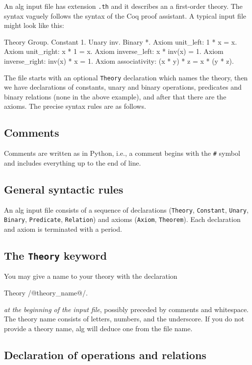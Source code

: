 \documentclass{article}
\begin{document}
An alg input file has extension \texttt{.th} and it describes an a
first-order theory. The syntax vaguely follows the syntax of the Coq
proof assistant. A typical input file might look like this:
%
\begin{source}
Theory Group.
Constant 1.
Unary inv.
Binary *.
Axiom unit_left: 1 * x = x.
Axiom unit_right: x * 1 = x.
Axiom inverse_left: x * inv(x) = 1.
Axiom inverse_right: inv(x) * x = 1.
Axiom associativity: (x * y) * z = x * (y * z).
\end{source}
%
The file starts with an optional \texttt{Theory} declaration which
names the theory, then we have declarations of constants, unary and
binary operations, predicates and binary relations (none in the above
example), and after that there are the axioms. The precise syntax
rules are as follows.

\subsection{Comments}

Comments are written as in Python, i.e., a comment begins with the
\texttt{\#} symbol and includes everything up to the end of line.

\subsection{General syntactic rules}

An alg input file consists of a sequence of declarations
(\texttt{Theory}, \texttt{Constant}, \texttt{Unary}, \texttt{Binary},
\texttt{Predicate}, \texttt{Relation}) and axioms (\texttt{Axiom},
\texttt{Theorem}). Each declaration and axiom is terminated with a
period.

\subsection{The \texttt{Theory} keyword}

You may give a name to your theory with the declaration
%
\begin{source}
Theory /@theory_name@/.
\end{source}
%
\emph{at the beginning of the input file}, possibly preceded by
comments and whitespace. The theory name consists of letters, numbers,
and the underscore. If you do not provide a theory name, alg will
deduce one from the file name.

\subsection{Declaration of operations and relations}
\end{document}
